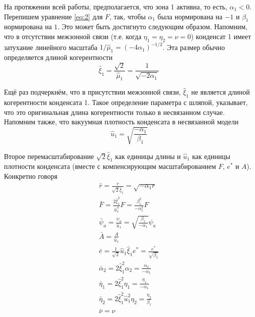 На протяжении всей работы, предполагается, что зона 1 активна, то есть, 
\( \alpha_1 < 0 \). Перепишем уравнение \eqref{eq:2} для \( F \), так, чтобы 
\( \alpha_1 \) была нормирована на \( -1 \) и \( \beta_1 \) нормирована на 
\( 1 \). Это может быть достигнуто следующим образом. Напомним, что в 
отсутствии межзонной связи (т.е. когда \( \eta_1 = \eta_2 = \nu = 0 \)) 
конденсат 1 имеет затухание линейного масштаба 
\( 1/\hat{\mu}_1 = (-4\alpha_1)^{-1/2} \). Эта размер обычно определяется 
длиной когерентности
\begin{equation}
    \hat{\xi}_1 = \frac{\sqrt{2}}{\hat{\mu}_1} = \frac{1}{\sqrt{-2\alpha_1}}
    \label{eq:A-4}
\end{equation}

Ещё раз подчеркнём, что в присутствии межзонной связи, \( \hat{\xi}_1 \) не
является длиной когерентности конденсата 1. Такое определение параметра с 
шляпой, указывает, что это оригинальная длина когерентности только в 
несвязанном случае. Напомним также, что вакуумная плотность конденсата в 
несвязанной модели
\begin{equation}
    \hat{u}_1 = \sqrt{\frac{-\alpha_1}{\beta_1}}
    \label{eq:B-5}
\end{equation}

Второе перемасштабирование \( \sqrt{2}\hat{\xi}_1 \) как единицы длины
и \( \hat{u}_1 \) как единицы плотности конденсата (вместе с компенсирующим
масштабированием \( F \), \( e^* \) и \( A \)). Конкретно говоря
\begin{gather}
  \bar{r} = \frac{r}{\sqrt{2}\hat{\xi}_1} = \sqrt{-\alpha_1 r} \nonumber \\
  \bar{F} = \frac{2\hat{\xi}^2_1}{\hat{u}^4_1}F =
    \frac{\beta^2_1}{-\alpha^3_1}F \nonumber \\
  \bar{\psi}_a = \frac{\psi_a}{\hat{u}_1} =
    \sqrt{\frac{\beta_1}{-\alpha_1}}\psi_a \nonumber \\
  \bar{A} = \frac{A}{\hat{u}_1} \\
  \bar{e} = \frac{1}{\sqrt{2}}\hat{u}_1\hat{\xi}_1 e^* =
    \frac{e^*}{\sqrt{\beta_1}} \nonumber \\
  \bar{\alpha}_2 = 2\hat{\xi}^2_1 \alpha_2 = \frac{\alpha_2}{-\alpha_1}
    \nonumber \\
  \bar{\eta}_1 = 2\hat{\xi}^2_1 \eta_1 = \frac{\eta_1}{-\alpha_1} \nonumber \\
  \bar{\eta}_2 = 2\hat{\xi}^2_1 \hat{u}^2_1 \eta_2 =
    \frac{\eta_2}{\beta_1} \nonumber \\
  \bar{\nu} = \nu \label{eq:B-6}
\end{gather}

